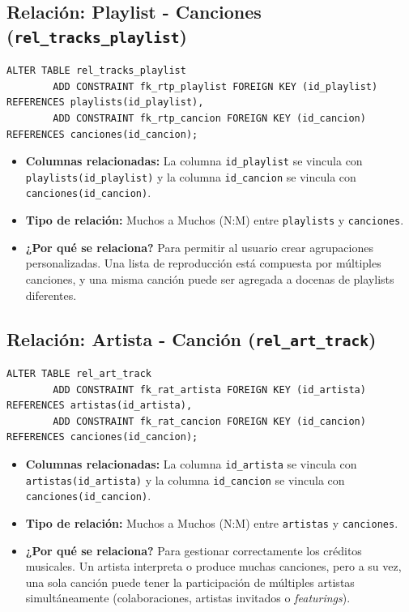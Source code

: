 \documentclass[11pt]{article}
\begin{document}
	\subsection{Relación: Playlist - Canciones (\texttt{rel\_tracks\_playlist})}
	\begin{lstlisting}[style=sqlstyle]
		ALTER TABLE rel_tracks_playlist
		ADD CONSTRAINT fk_rtp_playlist FOREIGN KEY (id_playlist) REFERENCES playlists(id_playlist),
		ADD CONSTRAINT fk_rtp_cancion FOREIGN KEY (id_cancion) REFERENCES canciones(id_cancion);
	\end{lstlisting}
	\begin{itemize}[noitemsep,topsep=2pt]
		\item \textbf{Columnas relacionadas:} La columna \texttt{id\_playlist} se vincula con \texttt{playlists(id\_playlist)} y la columna \texttt{id\_cancion} se vincula con \texttt{canciones(id\_cancion)}.
		\item \textbf{Tipo de relación:} Muchos a Muchos (N:M) entre \texttt{playlists} y \texttt{canciones}.
		\item \textbf{¿Por qué se relaciona?} Para permitir al usuario crear agrupaciones personalizadas. Una lista de reproducción está compuesta por múltiples canciones, y una misma canción puede ser agregada a docenas de playlists diferentes.
	\end{itemize}
	
	\vspace{0.5cm}
	
	\subsection{Relación: Artista - Canción (\texttt{rel\_art\_track})}
	\begin{lstlisting}[style=sqlstyle]
		ALTER TABLE rel_art_track
		ADD CONSTRAINT fk_rat_artista FOREIGN KEY (id_artista) REFERENCES artistas(id_artista),
		ADD CONSTRAINT fk_rat_cancion FOREIGN KEY (id_cancion) REFERENCES canciones(id_cancion);
	\end{lstlisting}
	\begin{itemize}[noitemsep,topsep=2pt]
		\item \textbf{Columnas relacionadas:} La columna \texttt{id\_artista} se vincula con \texttt{artistas(id\_artista)} y la columna \texttt{id\_cancion} se vincula con \texttt{canciones(id\_cancion)}.
		\item \textbf{Tipo de relación:} Muchos a Muchos (N:M) entre \texttt{artistas} y \texttt{canciones}.
		\item \textbf{¿Por qué se relaciona?} Para gestionar correctamente los créditos musicales. Un artista interpreta o produce muchas canciones, pero a su vez, una sola canción puede tener la participación de múltiples artistas simultáneamente (colaboraciones, artistas invitados o \textit{featurings}).
	\end{itemize}
	
\end{document}
